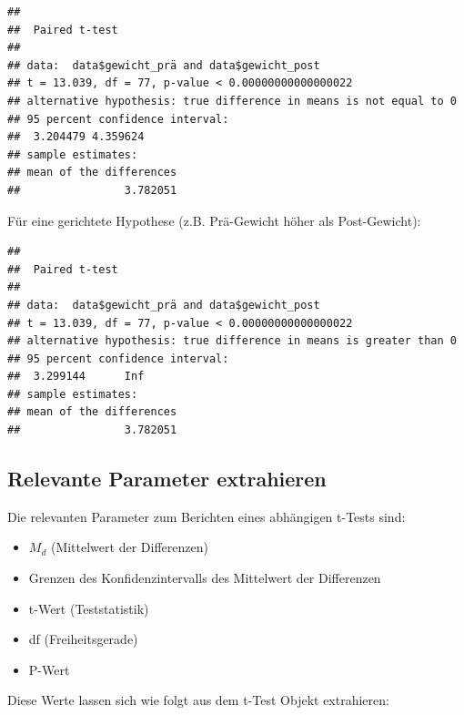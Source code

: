 \documentclass[
]{book}
\newenvironment{Shaded}{\begin{snugshade}}{\end{snugshade}}
\newcommand{\AttributeTok}[1]{\textcolor[rgb]{0.77,0.63,0.00}{#1}}
\newcommand{\FunctionTok}[1]{\textcolor[rgb]{0.00,0.00,0.00}{#1}}
\newcommand{\NormalTok}[1]{#1}
\newcommand{\SpecialCharTok}[1]{\textcolor[rgb]{0.00,0.00,0.00}{#1}}
\newcommand{\StringTok}[1]{\textcolor[rgb]{0.31,0.60,0.02}{#1}}
\providecommand{\tightlist}{%
  \setlength{\itemsep}{0pt}\setlength{\parskip}{0pt}}
\begin{document}
\begin{verbatim}
## 
##  Paired t-test
## 
## data:  data$gewicht_prä and data$gewicht_post
## t = 13.039, df = 77, p-value < 0.00000000000000022
## alternative hypothesis: true difference in means is not equal to 0
## 95 percent confidence interval:
##  3.204479 4.359624
## sample estimates:
## mean of the differences 
##                3.782051
\end{verbatim}

Für eine gerichtete Hypothese (z.B. Prä-Gewicht höher als Post-Gewicht):

\begin{Shaded}
\end{Shaded}

\begin{verbatim}
## 
##  Paired t-test
## 
## data:  data$gewicht_prä and data$gewicht_post
## t = 13.039, df = 77, p-value < 0.00000000000000022
## alternative hypothesis: true difference in means is greater than 0
## 95 percent confidence interval:
##  3.299144      Inf
## sample estimates:
## mean of the differences 
##                3.782051
\end{verbatim}

\hypertarget{relevante-parameter-extrahieren-1}{%
\subsection{Relevante Parameter extrahieren}\label{relevante-parameter-extrahieren-1}}

Die relevanten Parameter zum Berichten eines abhängigen t-Tests sind:

\begin{itemize}
\tightlist
\item
  \(M_d\) (Mittelwert der Differenzen)
\item
  Grenzen des Konfidenzintervalls des Mittelwert der Differenzen
\item
  t-Wert (Teststatistik)
\item
  df (Freiheitsgerade)
\item
  P-Wert
\end{itemize}

Diese Werte lassen sich wie folgt aus dem t-Test Objekt extrahieren:
\end{document}
